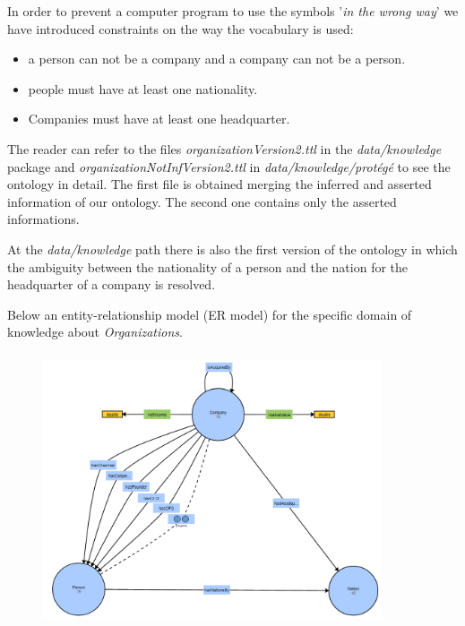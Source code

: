 In order to prevent a computer program to use the symbols '\textit{in the wrong way}' we have introduced  constraints on the way the vocabulary is used:
\begin{itemize}
\item a person can not be a company and a company can not be a person.
\item people must have at least one nationality.
\item Companies must have at least one headquarter. 
\end{itemize}

The reader can refer to the files \textit{organizationVersion2.ttl} in the \textit{data/knowledge} package and \textit{organizationNotInfVersion2.ttl} in \textit{data/knowledge/protégé} to see the ontology in detail. The first file is obtained merging the inferred and asserted information of our ontology. The second one contains only the asserted informations.  

At the \textit{data/knowledge} path there is also the first version of the ontology in which the ambiguity between the nationality of a person and the nation for the headquarter of a company is resolved.

Below an entity-relationship model (ER model) for the specific domain of knowledge about \textit{Organizations}.
\begin{figure}[H]
\centering
\includegraphics[width=10cm, height=8cm]{fig/ERDiagram.png}
\end{figure}

